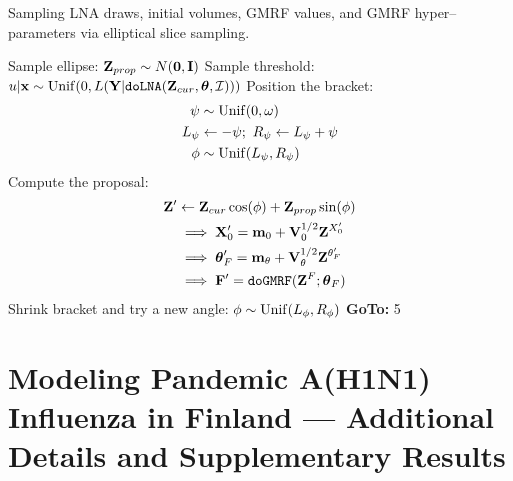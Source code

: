 \begin{algorithm}[htbp]
	\caption{Sampling LNA draws, initial volumes, GMRF values, and GMRF hyper--parameters via elliptical slice sampling.}
	\label{alg:elliptss_lna_gmrf}
	\begin{algorithmic}[1]
		\State Sample ellipse: $ \mathbf{Z}_{prop} \sim N(\boldsymbol{0}, \mathbf{I})$
		\State Sample threshold: $ u|\mathbf{x} \sim \mathrm{Unif}(0, L(\mathbf{Y}|\texttt{doLNA}(\mathbf{Z}_{cur},\boldsymbol{\theta},\mathcal{I}))) $
		\State Position the bracket: \vspace{-0.15in}
		\begin{align*}
		\psi &\sim \mathrm{Unif}(0,\omega)\\
		L_\psi &\leftarrow -\psi;\ R_\psi \leftarrow L_\psi + \psi\\
		\phi &\sim \mathrm{Unif}(L_\psi,R_\psi)
		\end{align*}
		\State Compute the proposal: \vspace{-0.1in}\begin{align*}
		\mathbf{Z}^\prime &\leftarrow \mathbf{Z}_{cur}\cos(\phi) + \mathbf{Z}_{prop}\sin(\phi) \\
		&\implies \mathbf{X}_0^\prime = \mathbf{m}_0 + \mathbf{V}_0^{1/2}\mathbf{Z}^{X_0^\prime}\\
		&\implies\boldsymbol{\theta}_F^\prime = \mathbf{m}_\theta + \mathbf{V}_\theta^{1/2}\mathbf{Z}^{\theta_F^\prime} \\
		&\implies\mathbf{F}^\prime = \texttt{doGMRF}(\mathbf{Z}^F;\boldsymbol{\theta}_F)
		\end{align*}
		\State{}
		\Else
		\State Shrink bracket and try a new angle:
		\State $ \phi \sim \mathrm{Unif}(L_\phi, R_\phi) $
		\State \textbf{GoTo:} 5
		\EndIf
		\EndProcedure
	\end{algorithmic}
\end{algorithm}

\section{Modeling Pandemic A(H1N1) Influenza in Finland --- Additional Details and Supplementary Results}
\label{sec:flu_supplement}

